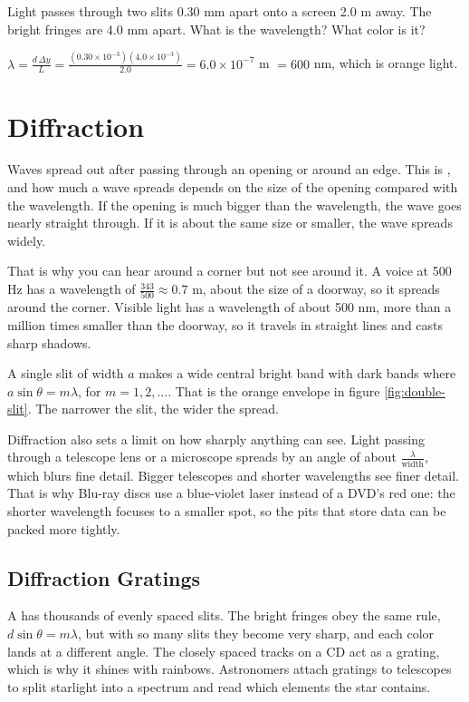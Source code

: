\begin{Exercise}[title={Measuring Light with a Ruler}, label=wv_measure]
Light passes through two slits 0.30 mm apart onto a screen 2.0 m away. The bright fringes are 4.0 mm apart. What
is the wavelength? What color is it?
\end{Exercise}
\begin{Answer}[ref=wv_measure]
$\lambda = \frac{d\,\Delta y}{L} = \frac{(0.30 \times 10^{-3})(4.0 \times 10^{-3})}{2.0} = 6.0 \times 10^{-7}$ m $= 600$ nm,
which is orange light.
\end{Answer}

\section{Diffraction}
Waves spread out after passing through an opening or around an edge. This is , and how much a
wave spreads depends on the size of the opening compared with the wavelength. If the opening is much bigger than the
wavelength, the wave goes nearly straight through. If it is about the same size or smaller, the wave spreads widely.

That is why you can hear around a corner but not see around it. A voice at 500 Hz has a wavelength of
$\frac{343}{500} \approx 0.7$ m, about the size of a doorway, so it spreads around the corner. Visible light has a
wavelength of about 500 nm, more than a million times smaller than the doorway, so it travels in straight lines and
casts sharp shadows.

A single slit of width $a$ makes a wide central bright band with dark bands where $a\sin\theta = m\lambda$, for
$m = 1, 2, \dots$. That is the orange envelope in figure \ref{fig:double-slit}. The narrower the slit, the wider the
spread.

Diffraction also sets a limit on how sharply anything can see. Light passing through a telescope lens or a microscope
spreads by an angle of about $\frac{\lambda}{\text{width}}$, which blurs fine detail. Bigger telescopes and shorter
wavelengths see finer detail. That is why Blu-ray discs use a blue-violet laser instead of a DVD's red one: the shorter
wavelength focuses to a smaller spot, so the pits that store data can be packed more tightly.

\subsection{Diffraction Gratings}
A  has thousands of evenly spaced slits. The bright fringes obey the same rule,
$d\sin\theta = m\lambda$, but with so many slits they become very sharp, and each color lands at a different angle.
The closely spaced tracks on a CD act as a grating, which is why it shines with rainbows. Astronomers attach gratings
to telescopes to split starlight into a spectrum and read which elements the star contains.

